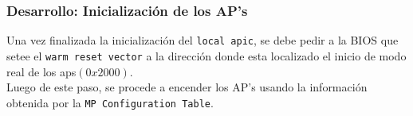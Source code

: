 \documentclass{beamer}
\begin{document}


\begin{frame}
  \frametitle{Desarrollo: \small Inicialización de los AP's}
  Una vez finalizada la inicialización del \texttt{local apic}, se debe pedir a la BIOS que setee el \texttt{warm reset vector} a la dirección donde esta localizado el inicio de modo real de los aps$(0x2000)$.\\
  \vspace{10pt}
  Luego de este paso, se procede a encender los AP's usando la información obtenida por la \texttt{MP Configuration Table}.
\end{frame}
\end{document}
